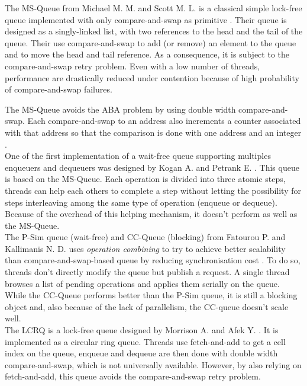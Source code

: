  The MS-Queue from Michael M. M. and Scott M. L. is a classical
simple lock-free queue implemented with only compare-and-swap as primitive
\cite{Michael96simple}. Their queue is designed as a singly-linked list, with
two references to the head and the tail of the queue. Their use compare-and-swap
to add (or remove) an element to the queue and to move the head and tail
reference. As a consequence, it is subject to the compare-and-swap retry
problem. Even with a low number of threads, performance are drastically reduced
under contention because of high probability of compare-and-swap failures.

The MS-Queue avoids the ABA problem by using double width compare-and-swap. Each
compare-and-swap to an address also increments a counter associated with that
address so that the comparison is done with one address and an integer
\cite{Herlihy08} \cite{Michael96simple}. \\

 One of the first implementation of a wait-free
queue supporting multiples enqueuers and dequeuers was designed by Kogan A. and
Petrank E. \cite{Kogan:2011:WQM:2038037.1941585}. This queue is based on the
MS-Queue. Each operation is divided into three atomic steps, threads can help
each others to complete a step without letting the possibility for steps
interleaving among the same type of operation (enqueue or dequeue). Because of
the overhead of this helping mechanism, it doesn't perform as well as the
MS-Queue. \\

 The P-Sim queue (wait-free) and CC-Queue (blocking)
from Fatourou P. and Kallimanis N. D. uses \textit{operation combining} to try
to achieve better scalability than compare-and-swap-based queue by reducing
synchronisation cost \cite{Fatourou:2011:HWU:1989493.1989549}
\cite{Fatourou:2012:RCS:2370036.2145849}. To do so, threads don't directly
modify the queue but publish a request. A single thread browses a list of
pending operations and applies them serially on the queue. While the CC-Queue
performs better than the P-Sim queue, it is still a blocking object and, also
because of the lack of parallelism, the CC-queue doesn't scale well. \\

 The LCRQ is a lock-free queue designed by Morrison A.
and Afek Y. \cite{Morrison:2013:FCQ:2517327.2442527}. It is implemented as a
circular ring queue. Threads use fetch-and-add to get a cell index on the queue,
enqueue and dequeue are then done with double width compare-and-swap, which is
not universally available. However, by also relying on fetch-and-add, this queue
avoids the compare-and-swap retry problem. \\

